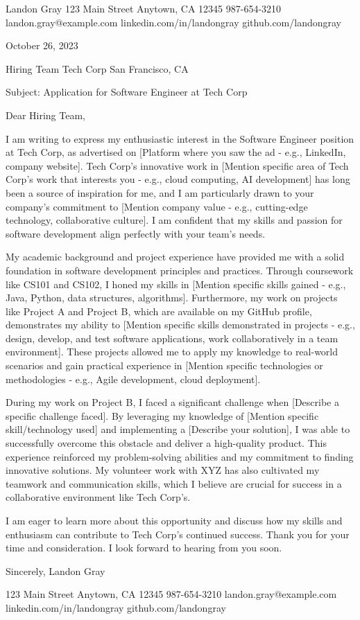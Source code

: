 \documentclass[
]{article}
\author{}
\date{}
\begin{document}
Landon Gray 123 Main Street Anytown, CA 12345 987-654-3210
landon.gray@example.com linkedin.com/in/landongray github.com/landongray

October 26, 2023

Hiring Team Tech Corp San Francisco, CA

Subject: Application for Software Engineer at Tech Corp

Dear Hiring Team,

I am writing to express my enthusiastic interest in the Software
Engineer position at Tech Corp, as advertised on {[}Platform where you
saw the ad - e.g., LinkedIn, company website{]}. Tech Corp's innovative
work in {[}Mention specific area of Tech Corp's work that interests you
- e.g., cloud computing, AI development{]} has long been a source of
inspiration for me, and I am particularly drawn to your company's
commitment to {[}Mention company value - e.g., cutting-edge technology,
collaborative culture{]}. I am confident that my skills and passion for
software development align perfectly with your team's needs.

My academic background and project experience have provided me with a
solid foundation in software development principles and practices.
Through coursework like CS101 and CS102, I honed my skills in {[}Mention
specific skills gained - e.g., Java, Python, data structures,
algorithms{]}. Furthermore, my work on projects like Project A and
Project B, which are available on my GitHub profile, demonstrates my
ability to {[}Mention specific skills demonstrated in projects - e.g.,
design, develop, and test software applications, work collaboratively in
a team environment{]}. These projects allowed me to apply my knowledge
to real-world scenarios and gain practical experience in {[}Mention
specific technologies or methodologies - e.g., Agile development, cloud
deployment{]}.

During my work on Project B, I faced a significant challenge when
{[}Describe a specific challenge faced{]}. By leveraging my knowledge of
{[}Mention specific skill/technology used{]} and implementing a
{[}Describe your solution{]}, I was able to successfully overcome this
obstacle and deliver a high-quality product. This experience reinforced
my problem-solving abilities and my commitment to finding innovative
solutions. My volunteer work with XYZ has also cultivated my teamwork
and communication skills, which I believe are crucial for success in a
collaborative environment like Tech Corp's.

I am eager to learn more about this opportunity and discuss how my
skills and enthusiasm can contribute to Tech Corp's continued success.
Thank you for your time and consideration. I look forward to hearing
from you soon.

Sincerely, Landon Gray

123 Main Street Anytown, CA 12345 987-654-3210 landon.gray@example.com
linkedin.com/in/landongray github.com/landongray
\end{document}
